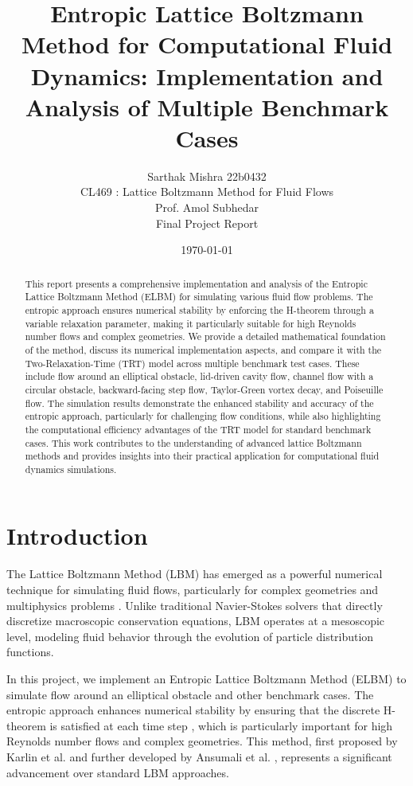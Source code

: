 \documentclass[12pt,a4paper]{article}
\title{Entropic Lattice Boltzmann Method for Computational Fluid Dynamics: Implementation and Analysis of Multiple Benchmark Cases}
\author{Sarthak Mishra 22b0432 \\ CL469 : Lattice Boltzmann Method for Fluid Flows \\ Prof. Amol Subhedar \\ Final Project Report }
\date{\today}
\begin{document}
\maketitle

\begin{abstract}
This report presents a comprehensive implementation and analysis of the Entropic Lattice Boltzmann Method (ELBM) for simulating various fluid flow problems. The entropic approach ensures numerical stability by enforcing the H-theorem through a variable relaxation parameter, making it particularly suitable for high Reynolds number flows and complex geometries. We provide a detailed mathematical foundation of the method, discuss its numerical implementation aspects, and compare it with the Two-Relaxation-Time (TRT) model across multiple benchmark test cases. These include flow around an elliptical obstacle, lid-driven cavity flow, channel flow with a circular obstacle, backward-facing step flow, Taylor-Green vortex decay, and Poiseuille flow. The simulation results demonstrate the enhanced stability and accuracy of the entropic approach, particularly for challenging flow conditions, while also highlighting the computational efficiency advantages of the TRT model for standard benchmark cases. This work contributes to the understanding of advanced lattice Boltzmann methods and provides insights into their practical application for computational fluid dynamics simulations.
\end{abstract}
\newpage
\tableofcontents
\newpage
\section{Introduction}
The Lattice Boltzmann Method (LBM) has emerged as a powerful numerical technique for simulating fluid flows, particularly for complex geometries and multiphysics problems \citep{kruger2017}. Unlike traditional Navier-Stokes solvers that directly discretize macroscopic conservation equations, LBM operates at a mesoscopic level, modeling fluid behavior through the evolution of particle distribution functions.

In this project, we implement an Entropic Lattice Boltzmann Method (ELBM) to simulate flow around an elliptical obstacle and other benchmark cases. The entropic approach enhances numerical stability by ensuring that the discrete H-theorem is satisfied at each time step \citep{karlin2015}, which is particularly important for high Reynolds number flows and complex geometries. This method, first proposed by Karlin et al. \citep{karlin1999} and further developed by Ansumali et al. \citep{ansumali2003}, represents a significant advancement over standard LBM approaches.
\end{document}
